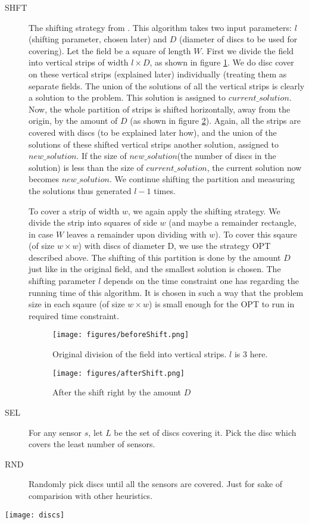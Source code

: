 \begin{description}
\item[SHFT] The shifting strategy from \cite{shifting}. This algorithm takes two input parameters: $l$ (shifting parameter, chosen later) and $D$ (diameter of discs to be used for covering). Let the field be a square of length $W$. First we divide the field into vertical strips of width $l \times D$, as shown in figure \ref{fig:origStrip}. We do disc cover on these vertical strips (explained later) individually (treating them as separate fields. The union of the solutions of all the vertical strips is clearly a solution to the problem. This solution is assigned to $current\_solution$. Now, the whole partition of strips is shifted horizontally, away from the origin, by the amount of $D$ (as shown in figure \ref{fig:shiftStrip}). Again, all the strips are covered with discs (to be explained later how), and the union of the solutions of these shifted vertical strips another solution, assigned to $new\_solution$. If the size of $new\_solution$(the number of discs in the solution) is less than the size of $current\_solution$, the current solution now becomes $new\_solution$. We continue shifting the partition and measuring the solutions thus generated $l-1$ times.

To cover a strip of width $w$, we again apply the shifting strategy. We divide the strip into squares of side $w$ (and maybe a remainder rectangle, in case $W$ leaves a remainder upon dividing with $w$). To cover this sqaure (of size $w \times w$) with discs of diameter D, we use the strategy OPT described above. The shifting of this partition is done by the amount $D$ just like in the original field, and the smallest solution is chosen. The shifting parameter $l$ depends on the time constraint one has regarding the running time of this algorithm. It is chosen in such a way that the problem size in each sqaure (of size $w \times w$) is small enough for the OPT to run in required time constraint.

\begin{figure}[H]

\texttt{[image: figures/beforeShift.png]}
\caption{Original division of the field into vertical strips. $l$ is 3 here.} \label{fig:origStrip}

\end{figure}

\begin{figure}[H]

\texttt{[image: figures/afterShift.png]}

\caption{After the shift right by the amount $D$}\label{fig:shiftStrip}

\end{figure}

\item[SEL] For any sensor $s$, let $L$ be the set of discs covering it. Pick the disc which covers the least number of sensors.
\item[RND] Randomly pick discs until all the sensors are covered. Just for sake of comparision with other heuristics.
\end{description}

\texttt{[image: discs]}